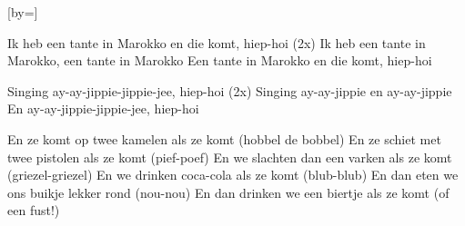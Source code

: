  

[by=]




\beginverse
Ik heb een tante in Marokko en die komt,
hiep-hoi (2x)
Ik heb een tante in Marokko,
een tante in Marokko
Een tante in Marokko en die komt, hiep-hoi
\endverse

\beginchorus
    Singing ay-ay-jippie-jippie-jee, hiep-hoi (2x)
    Singing ay-ay-jippie en ay-ay-jippie
    En ay-ay-jippie-jippie-jee, hiep-hoi
\endchorus

\beginverse
En ze komt op twee kamelen als ze komt (hobbel de bobbel)
\endverse
\beginverse
En ze schiet met twee pistolen als ze komt (pief-poef)
\endverse
\beginverse
En we slachten dan een varken als ze komt (griezel-griezel)
\endverse
\beginverse
En we drinken coca-cola als ze komt (blub-blub)
\endverse
\beginverse
En dan eten we ons buikje lekker rond (nou-nou)
\endverse
\beginverse
En dan drinken we een biertje als ze komt (of een fust!)
\endverse




\endsong
